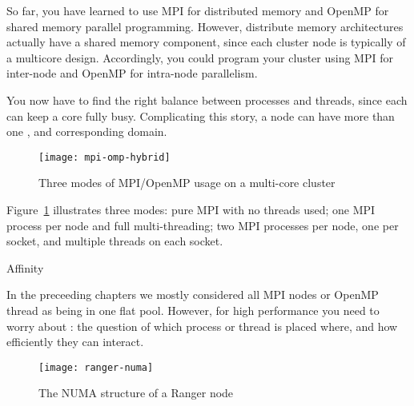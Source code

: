 
So far, you have learned to use MPI for distributed memory and OpenMP
for shared memory parallel programming. However, distribute memory
architectures actually have a shared memory component, since each
cluster node is typically of a multicore design. Accordingly, you
could program your cluster using MPI for inter-node and OpenMP for
intra-node parallelism.

You now have to find the right balance between processes and threads,
since each can keep a core fully busy.
Complicating this story, a node can have more than one ,
and corresponding  domain.
%
\begin{figure}[ht]
  \texttt{[image: mpi-omp-hybrid]}
  \caption{Three modes of MPI/OpenMP usage on a multi-core cluster}
  \label{fig:hybrid-modes}
\end{figure}
%
Figure~\ref{fig:hybrid-modes} illustrates three modes: pure MPI
with no threads used; one MPI process per node and full
multi-threading; two MPI processes per node, one per socket, and
multiple threads on each socket.

 {Affinity}


In the preceeding chapters we mostly considered all MPI nodes or
OpenMP thread as being in one flat pool.
However, for high performance you need to worry about :
the question of which process or thread is placed where, and how
efficiently they can interact.

\begin{figure}[ht]
  \texttt{[image: ranger-numa]}
  \caption{The NUMA structure of a Ranger node}
  \label{fig:ranger-numa}
\end{figure}

